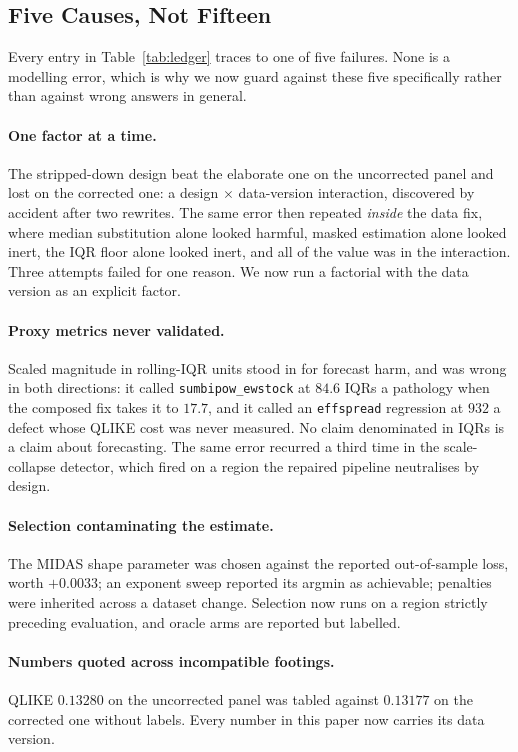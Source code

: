 \subsection{Five Causes, Not Fifteen}

Every entry in Table~\ref{tab:ledger} traces to one of five failures. None is a
modelling error, which is why we now guard against these five specifically
rather than against wrong answers in general.

\paragraph{One factor at a time.} The stripped-down design beat the elaborate
one on the uncorrected panel and lost on the corrected one: a design $\times$
data-version interaction, discovered by accident after two rewrites. The same
error then repeated \emph{inside} the data fix, where median substitution alone
looked harmful, masked estimation alone looked inert, the IQR floor alone
looked inert, and all of the value was in the interaction. Three attempts
failed for one reason. We now run a factorial with the data version as an
explicit factor.

\paragraph{Proxy metrics never validated.} Scaled magnitude in rolling-IQR
units stood in for forecast harm, and was wrong in both directions: it called
\texttt{sumbipow\_ewstock} at $84.6$ IQRs a pathology when the composed fix
takes it to $17.7$, and it called an \texttt{effspread} regression at $932$ a
defect whose QLIKE cost was never measured. No claim denominated in IQRs is a
claim about forecasting. The same error recurred a third time in the scale-
collapse detector, which fired on a region the repaired pipeline neutralises by
design.

\paragraph{Selection contaminating the estimate.} The MIDAS shape parameter was
chosen against the reported out-of-sample loss, worth $+0.0033$; an exponent
sweep reported its argmin as achievable; penalties were inherited across a
dataset change. Selection now runs on a region strictly preceding evaluation,
and oracle arms are reported but labelled.

\paragraph{Numbers quoted across incompatible footings.} QLIKE $0.13280$ on the
uncorrected panel was tabled against $0.13177$ on the corrected one without
labels. Every number in this paper now carries its data version.

